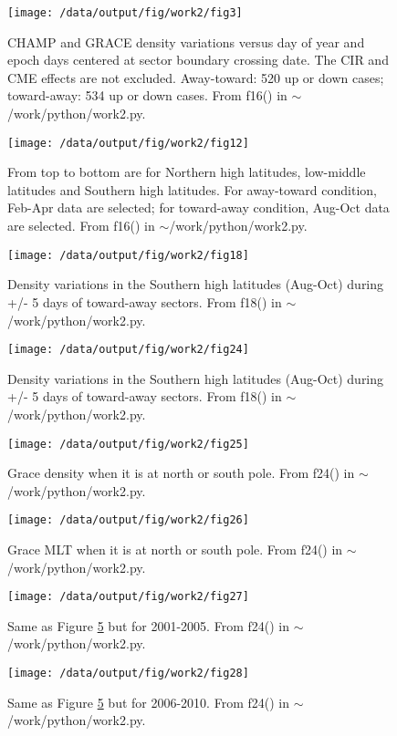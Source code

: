 \documentclass[12pt,a4paper]{article}
\begin{document}
\begin{figure}[!ht]
    \centering
    \texttt{[image: /data/output/fig/work2/fig3]}
    \label{fig6}
    \caption{CHAMP and GRACE density variations versus day of year and epoch days centered at sector boundary crossing date. The CIR and CME effects are not excluded. Away-toward: 520 up or down cases; toward-away: 534 up or down cases. From f16() in $\sim$/work/python/work2.py. }
\end{figure}

\begin{figure}[!ht]
    \centering
    \texttt{[image: /data/output/fig/work2/fig12]}
    \label{fig7}
    \caption{From top to bottom are for Northern high latitudes, low-middle latitudes and Southern high latitudes. For away-toward condition, Feb-Apr data are selected; for toward-away condition, Aug-Oct data are selected. From f16() in $\sim$/work/python/work2.py.}
\end{figure}

\begin{figure}[!ht]
    \centering
    \texttt{[image: /data/output/fig/work2/fig18]}
    \label{fig8}
    \caption{Density variations in the Southern high latitudes (Aug-Oct) during +/- 5 days of toward-away sectors. From f18() in $\sim$/work/python/work2.py.}
\end{figure}

\begin{figure}[!ht]
    \centering
    \texttt{[image: /data/output/fig/work2/fig24]}
    \label{fig9}
    \caption{Density variations in the Southern high latitudes (Aug-Oct) during +/- 5 days of toward-away sectors. From f18() in $\sim$/work/python/work2.py.}
\end{figure}

\begin{figure}[!ht]
    \centering
    \texttt{[image: /data/output/fig/work2/fig25]}
    \caption{Grace density when it is at north or south pole. From f24() in $\sim$/work/python/work2.py.}
    \label{fig10}
\end{figure}

\begin{figure}[!ht]
    \centering
    \texttt{[image: /data/output/fig/work2/fig26]}
    \label{fig11}
    \caption{Grace MLT when it is at north or south pole. From f24() in $\sim$/work/python/work2.py.}
\end{figure}

\begin{figure}[!ht]
    \centering
    \texttt{[image: /data/output/fig/work2/fig27]}
    \label{fig12}
    \caption{Same as Figure \ref{fig10} but for 2001-2005. From f24() in $\sim$/work/python/work2.py.}
\end{figure}

\begin{figure}[!ht]
    \centering
    \texttt{[image: /data/output/fig/work2/fig28]}
    \label{fig13}
    \caption{Same as Figure \ref{fig10} but for 2006-2010. From f24() in $\sim$/work/python/work2.py.}
\end{figure}
\end{document}
